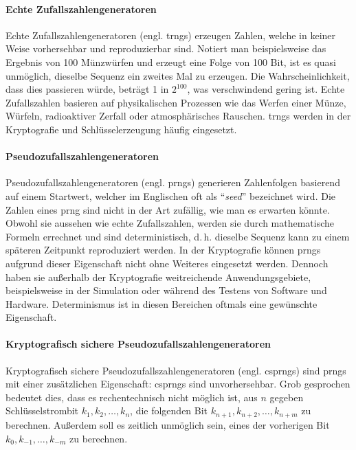 \paragraph{Echte Zufallszahlengeneratoren}
Echte Zufallszahlengeneratoren (engl. \acp{trng})
erzeugen Zahlen, welche in keiner Weise vorhersehbar und reproduzierbar sind. Notiert man
beispielsweise das Ergebnis von 100 Münzwürfen und erzeugt eine Folge von 100 Bit, ist es quasi
unmöglich, dieselbe Sequenz ein zweites Mal zu erzeugen. Die Wahrscheinlichkeit,
dass dies passieren würde, beträgt 1 in $2^{100}$, was verschwindend gering ist.
Echte Zufallszahlen basieren auf physikalischen Prozessen wie das Werfen einer Münze, Würfeln,
radioaktiver Zerfall oder atmosphärisches Rauschen. \acp{trng} werden in der Kryptografie und
Schlüsselerzeugung häufig eingesetzt.

\paragraph{Pseudozufallszahlengeneratoren}
Pseudozufallszahlengeneratoren (engl. \acp{prng})
generieren Zahlenfolgen basierend auf einem Startwert, welcher im Englischen oft als
\enquote{\textit{seed}} bezeichnet wird. Die Zahlen eines \ac{prng} sind nicht
in der Art zufällig, wie man es erwarten könnte.
Obwohl sie aussehen wie echte Zufallszahlen, werden sie durch
mathematische Formeln errechnet und sind deterministisch, d.\,h. dieselbe Sequenz
kann zu einem späteren Zeitpunkt reproduziert werden.
In der Kryptografie können \acp{prng} aufgrund dieser Eigenschaft
nicht ohne Weiteres eingesetzt werden.
Dennoch haben sie außerhalb der Kryptografie weitreichende Anwendungsgebiete,
beispielsweise in der Simulation oder während des Testens von Software und Hardware.
Determinismus ist in diesen Bereichen oftmals eine gewünschte Eigenschaft.

\paragraph{Kryptografisch sichere Pseudozufallszahlengeneratoren}
Kryptografisch sichere Pseudozufallszahlengeneratoren
(engl. \acp{csprng}) sind \acp{prng} mit
einer zusätzlichen Eigenschaft: \acp{csprng} sind unvorhersehbar. Grob gesprochen
bedeutet dies, dass es rechentechnisch nicht möglich ist, aus $n$ gegeben Schlüsselstrombit
$k_1,k_2,\dots,k_n$, die folgenden Bit $k_{n+1},k_{n+2},\dots,k_{n+m}$ zu berechnen. Außerdem
soll es zeitlich unmöglich sein, eines der vorherigen Bit
$k_{0},k_{-1},\allowbreak\dots,k_{-m}$ zu berechnen.

